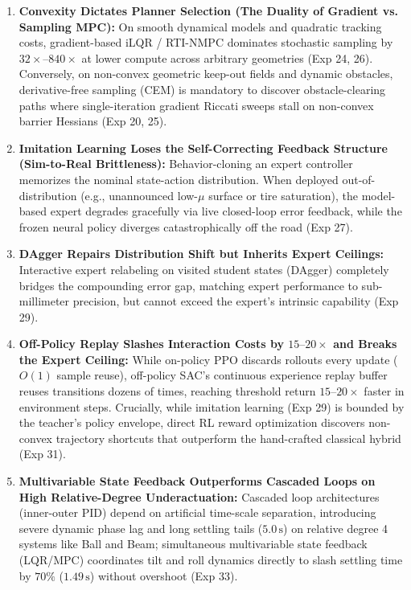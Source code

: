 \documentclass[11pt,a4paper]{article}
\begin{document}
\begin{enumerate}
  \item \textbf{Convexity Dictates Planner Selection (The Duality of Gradient vs. Sampling MPC):} On smooth dynamical models and quadratic tracking costs, gradient-based iLQR / RTI-NMPC dominates stochastic sampling by $32\times\text{--}840\times$ at lower compute across arbitrary geometries (Exp 24, 26). Conversely, on non-convex geometric keep-out fields and dynamic obstacles, derivative-free sampling (CEM) is mandatory to discover obstacle-clearing paths where single-iteration gradient Riccati sweeps stall on non-convex barrier Hessians (Exp 20, 25).
  \item \textbf{Imitation Learning Loses the Self-Correcting Feedback Structure (Sim-to-Real Brittleness):} Behavior-cloning an expert controller memorizes the nominal state-action distribution. When deployed out-of-distribution (e.g., unannounced low-$\mu$ surface or tire saturation), the model-based expert degrades gracefully via live closed-loop error feedback, while the frozen neural policy diverges catastrophically off the road (Exp 27).
  \item \textbf{DAgger Repairs Distribution Shift but Inherits Expert Ceilings:} Interactive expert relabeling on visited student states (DAgger) completely bridges the compounding error gap, matching expert performance to sub-millimeter precision, but cannot exceed the expert's intrinsic capability (Exp 29).
  \item \textbf{Off-Policy Replay Slashes Interaction Costs by $15\text{--}20\times$ and Breaks the Expert Ceiling:} While on-policy PPO discards rollouts every update ($O(1)$ sample reuse), off-policy SAC's continuous experience replay buffer reuses transitions dozens of times, reaching threshold return $15\text{--}20\times$ faster in environment steps. Crucially, while imitation learning (Exp 29) is bounded by the teacher's policy envelope, direct RL reward optimization discovers non-convex trajectory shortcuts that outperform the hand-crafted classical hybrid (Exp 31).
  \item \textbf{Multivariable State Feedback Outperforms Cascaded Loops on High Relative-Degree Underactuation:} Cascaded loop architectures (inner-outer PID) depend on artificial time-scale separation, introducing severe dynamic phase lag and long settling tails ($5.0\,\text{s}$) on relative degree 4 systems like Ball and Beam; simultaneous multivariable state feedback (LQR/MPC) coordinates tilt and roll dynamics directly to slash settling time by $70\%$ ($1.49\,\text{s}$) without overshoot (Exp 33).

\end{enumerate}
\end{document}
